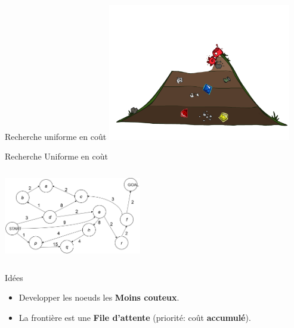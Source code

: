 \documentclass{beamer}
\begin{document}
\begin{frame}[t]{Recherche uniforme en coût}
\centering  
\includegraphics[width=8cm,height=6cm]{./images/uniform_cost_search.png}
\end{frame}


\begin{frame}[t]{Recherche Uniforme en coùt}
  
 \begin{center}
   \includegraphics[width=6cm,height=4cm]{./images/cost_sensitive_search.png}
 \end{center}

 \begin{block}{Idées}
   \begin{itemize}
  \small
\item Developper les noeuds les \alert{\textbf{Moins couteux}}.
\item La frontière est une \alert{\textbf{File d'attente}} (priorité: coût
  \textbf{accumulé}).
\end{itemize}
 \end{block}
\end{frame}
\end{document}
